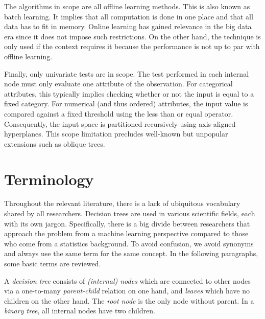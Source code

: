 The algorithms in scope are all offline learning methods. This is also known as batch learning. It implies that all computation is done in one place and that all data has to fit in memory. Online learning has gained relevance in the big data era since it does not impose such restrictions. On the other hand, the technique is only used if the context requires it because the performance is not up to par with offline learning.

Finally, only univariate tests are in scope. The test performed in each internal node must only evaluate one attribute of the observation. For categorical attributes, this typically implies checking whether or not the input is equal to a fixed category. For numerical (and thus ordered) attributes, the input value is compared against a fixed threshold using the less than or equal operator. Consequently, the input space is partitioned recursively using axis-aligned hyperplanes. This scope limitation precludes well-known but unpopular extensions such as oblique trees.

\section{Terminology}
Throughout the relevant literature, there is a lack of ubiquitous vocabulary shared by all researchers. Decision trees are used in various scientific fields, each with its own jargon. Specifically, there is a big divide between researchers that approach the problem from a machine learning perspective compared to those who come from a statistics background. To avoid confusion, we avoid synonyms and always use the same term for the same concept. In the following paragraphs, some basic terms are reviewed. 

A \emph{decision tree} consists of \emph{(internal) nodes} which are connected to other nodes via a one-to-many \emph{parent-child} relation on one hand, and \emph{leaves} which have no children on the other hand. The \emph{root node} is the only node without parent. In a \emph{binary tree}, all internal nodes have two children.

